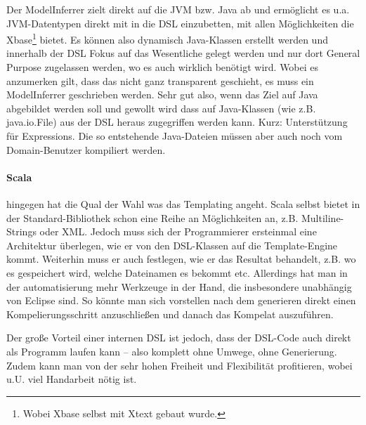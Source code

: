 Der ModelInferrer zielt direkt auf die JVM bzw. Java ab und ermöglicht es
u.a. JVM-Datentypen direkt mit in die DSL einzubetten, mit allen Möglichkeiten
die Xbase\footnote{Wobei Xbase selbst mit Xtext gebaut wurde.}
bietet. Es können also dynamisch Java-Klassen erstellt werden und innerhalb
der DSL Fokus auf das Wesentliche gelegt werden und nur dort General Purpose
zugelassen werden, wo es auch wirklich benötigt wird.
Wobei es anzumerken gilt, dass das nicht ganz transparent geschieht,
es muss ein ModelInferrer geschrieben werden.
Sehr gut also, wenn das Ziel auf Java abgebildet werden soll und gewollt wird
dass auf Java-Klassen (wie z.B. java.io.File) aus der DSL heraus
zugegriffen werden kann. Kurz: Unterstützung für Expressions.
Die so entstehende Java-Dateien müssen aber auch noch vom Domain-Benutzer
kompiliert werden.\cite{xtext}

\paragraph{Scala} hingegen hat die Qual der Wahl was das Templating angeht.
Scala selbst bietet in der Standard-Bibliothek schon
eine Reihe an Möglichkeiten an,
z.B. Multiline-Strings oder XML. Jedoch muss sich der Programmierer ersteinmal
eine Architektur überlegen, wie er von den DSL-Klassen auf die Template-Engine
kommt. Weiterhin muss er auch festlegen, wie er das Resultat behandelt,
z.B. wo es gespeichert wird, welche Dateinamen es bekommt etc.
Allerdings hat man in der automatisierung mehr Werkzeuge in der Hand,
die insbesondere unabhängig von Eclipse sind. So könnte man sich vorstellen
nach dem generieren direkt einen Kompelierungsschritt anzuschließen und
danach das Kompelat auszuführen.

Der große Vorteil einer internen DSL ist jedoch, dass der DSL-Code auch
direkt als Programm laufen kann -- also komplett ohne Umwege, ohne Generierung.
Zudem kann man von der sehr hohen Freiheit und Flexibilität profitieren,
wobei u.U. viel Handarbeit nötig ist.


